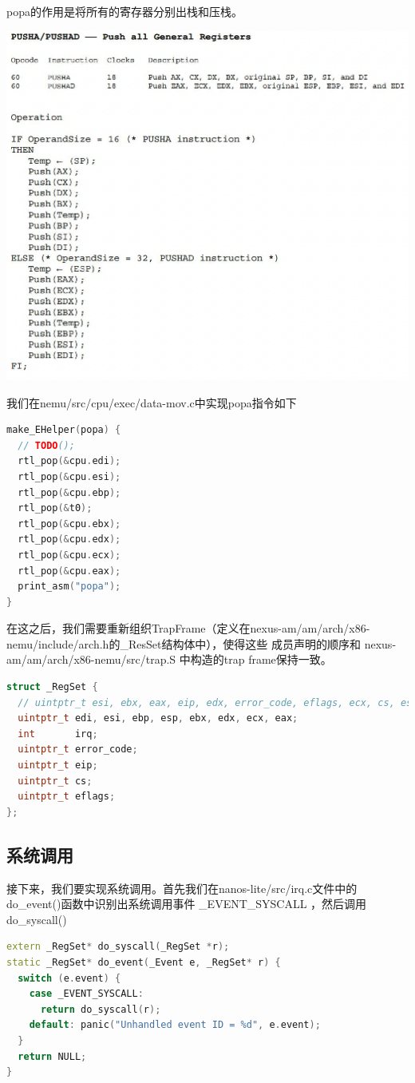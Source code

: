 \documentclass[UTF8,a4paper,10pt]{ctexart}
\begin{document}
popa的作用是将所有的寄存器分别出栈和压栈。
\begin{center}
  \includegraphics*[scale= 0.7]{pic/截屏2022-05-16 00.07.42.png}
\end{center}
我们在nemu/src/cpu/exec/data-mov.c中实现popa指令如下
\begin{lstlisting}[language = C++]
make_EHelper(popa) {
  // TODO();
  rtl_pop(&cpu.edi);
  rtl_pop(&cpu.esi);
  rtl_pop(&cpu.ebp);
  rtl_pop(&t0);
  rtl_pop(&cpu.ebx);
  rtl_pop(&cpu.edx);
  rtl_pop(&cpu.ecx);
  rtl_pop(&cpu.eax);
  print_asm("popa");
}
\end{lstlisting}

在这之后，我们需要重新组织TrapFrame（定义在nexus-am/am/arch/x86-nemu/include/arch.h的\_ResSet结构体中），使得这些
成员声明的顺序和 nexus-am/am/arch/x86-nemu/src/trap.S 中构造的trap frame保持一致。
\begin{lstlisting}[language = C++]
struct _RegSet {
  // uintptr_t esi, ebx, eax, eip, edx, error_code, eflags, ecx, cs, esp, edi, ebp;
  uintptr_t edi, esi, ebp, esp, ebx, edx, ecx, eax;
  int       irq;
  uintptr_t error_code;
  uintptr_t eip;
  uintptr_t cs;
  uintptr_t eflags;
};
\end{lstlisting}
\color{red}{在这里的时候，我们又出现了段错误的bug，见bug总结/HAS ASYE宏开启}
\normalcolor
\subsection{系统调用}
接下来，我们要实现系统调用。首先我们在nanos-lite/src/irq.c文件中的do\_event()函数中识别出系统调用事件 \_EVENT\_SYSCALL ，然后调用 do\_syscall()
\begin{lstlisting}[language = C++]
extern _RegSet* do_syscall(_RegSet *r);
static _RegSet* do_event(_Event e, _RegSet* r) {
  switch (e.event) {
    case _EVENT_SYSCALL:
      return do_syscall(r);
    default: panic("Unhandled event ID = %d", e.event);
  }
  return NULL;
}
\end{lstlisting}
\end{document}
